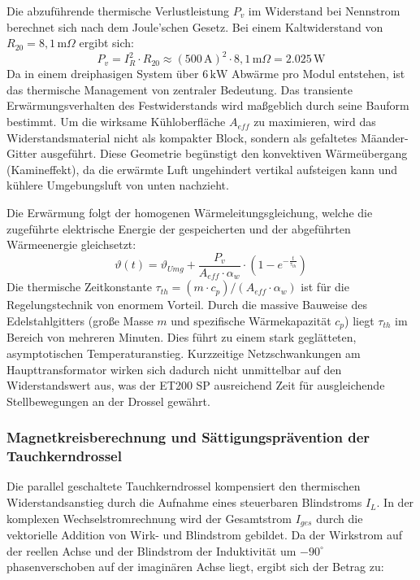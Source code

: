 Die abzuführende thermische Verlustleistung $P_v$ im Widerstand bei Nennstrom berechnet sich nach dem Joule'schen Gesetz. Bei einem Kaltwiderstand von $R_{20} = 8,1\,\text{m}\Omega$ ergibt sich:
\begin{equation}
    P_v = I_R^2 \cdot R_{20} \approx (500\,\text{A})^2 \cdot 8,1\,\text{m}\Omega = 2.025\,\text{W}
\end{equation}
Da in einem dreiphasigen System über $6\,\text{kW}$ Abwärme pro Modul entstehen, ist das thermische Management von zentraler Bedeutung. Das transiente Erwärmungsverhalten des Festwiderstands wird maßgeblich durch seine Bauform bestimmt. Um die wirksame Kühloberfläche $A_{eff}$ zu maximieren, wird das Widerstandsmaterial nicht als kompakter Block, sondern als gefaltetes Mäander-Gitter ausgeführt. Diese Geometrie begünstigt den konvektiven Wärmeübergang (Kamineffekt), da die erwärmte Luft ungehindert vertikal aufsteigen kann und kühlere Umgebungsluft von unten nachzieht.

Die Erwärmung folgt der homogenen Wärmeleitungsgleichung, welche die zugeführte elektrische Energie der gespeicherten und der abgeführten Wärmeenergie gleichsetzt:
\begin{equation}
    \vartheta(t) = \vartheta_{Umg} + \frac{P_v}{A_{eff} \cdot \alpha_w} \cdot \left( 1 - e^{-\frac{t}{\tau_{th}}} \right)
\end{equation}
Die thermische Zeitkonstante $\tau_{th} = (m \cdot c_p) / (A_{eff} \cdot \alpha_w)$ ist für die Regelungstechnik von enormem Vorteil. Durch die massive Bauweise des Edelstahlgitters (große Masse $m$ und spezifische Wärmekapazität $c_p$) liegt $\tau_{th}$ im Bereich von mehreren Minuten. Dies führt zu einem stark geglätteten, asymptotischen Temperaturanstieg. Kurzzeitige Netzschwankungen am Haupttransformator wirken sich dadurch nicht unmittelbar auf den Widerstandswert aus, was der ET200 SP ausreichend Zeit für ausgleichende Stellbewegungen an der Drossel gewährt.
\subsubsection{Magnetkreisberechnung und Sättigungsprävention der Tauchkerndrossel}
\label{sec:auslegung_drossel}

Die parallel geschaltete Tauchkerndrossel kompensiert den thermischen Widerstandsanstieg durch die Aufnahme eines steuerbaren Blindstroms $I_L$. In der komplexen Wechselstromrechnung wird der Gesamtstrom $I_{ges}$ durch die vektorielle Addition von Wirk- und Blindstrom gebildet. Da der Wirkstrom auf der reellen Achse und der Blindstrom der Induktivität um $-90^\circ$ phasenverschoben auf der imaginären Achse liegt, ergibt sich der Betrag zu:

